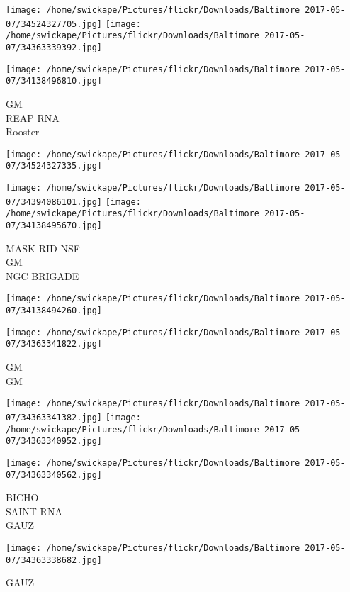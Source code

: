 \documentclass[10pt,letterpaper]{article}
\begin{document}
\texttt{[image: /home/swickape/Pictures/flickr/Downloads/Baltimore 2017-05-07/34524327705.jpg]}
\texttt{[image: /home/swickape/Pictures/flickr/Downloads/Baltimore 2017-05-07/34363339392.jpg]}

\texttt{[image: /home/swickape/Pictures/flickr/Downloads/Baltimore 2017-05-07/34138496810.jpg]}

GM\\
REAP RNA\\
Rooster\\
\pagebreak

\texttt{[image: /home/swickape/Pictures/flickr/Downloads/Baltimore 2017-05-07/34524327335.jpg]}

\vspace{0.25in}
\texttt{[image: /home/swickape/Pictures/flickr/Downloads/Baltimore 2017-05-07/34394086101.jpg]}
\texttt{[image: /home/swickape/Pictures/flickr/Downloads/Baltimore 2017-05-07/34138495670.jpg]}

MASK RID NSF\\
GM\\
NGC BRIGADE\\
\pagebreak

\texttt{[image: /home/swickape/Pictures/flickr/Downloads/Baltimore 2017-05-07/34138494260.jpg]}

\vspace{0.25in}
\texttt{[image: /home/swickape/Pictures/flickr/Downloads/Baltimore 2017-05-07/34363341822.jpg]}

GM\\
GM\\
\pagebreak

\texttt{[image: /home/swickape/Pictures/flickr/Downloads/Baltimore 2017-05-07/34363341382.jpg]}
\texttt{[image: /home/swickape/Pictures/flickr/Downloads/Baltimore 2017-05-07/34363340952.jpg]}

\vspace{0.25in}
\texttt{[image: /home/swickape/Pictures/flickr/Downloads/Baltimore 2017-05-07/34363340562.jpg]}

BICHO\\
SAINT RNA\\
GAUZ\\
\pagebreak

\texttt{[image: /home/swickape/Pictures/flickr/Downloads/Baltimore 2017-05-07/34363338682.jpg]}

GAUZ\\
\pagebreak
\end{document}
